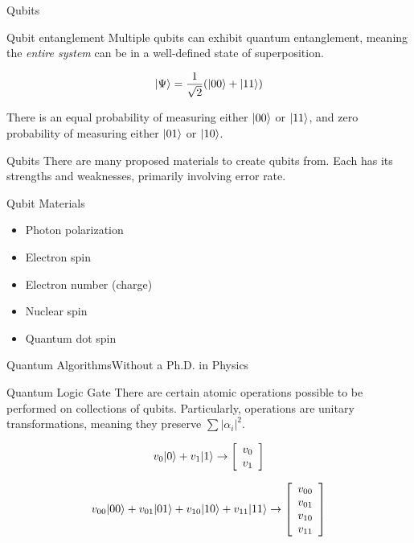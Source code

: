 \documentclass[12pt]{beamer}
\begin{document}
\begin{frame}{Qubits}
	\begin{block}{Qubit entanglement}
		Multiple qubits can exhibit quantum entanglement, meaning the
		\textit{entire system} can be in a well-defined state of superposition.

		\[ |\Psi\rangle = \frac{1}{\sqrt2}(|00\rangle + |11\rangle) \]

		There is an equal probability of measuring either $|00\rangle$ or
		$|11\rangle$, and zero probability of measuring either $|01\rangle$ or
		$|10\rangle$.
	\end{block}
\end{frame}

\begin{frame}{Qubits}
	There are many proposed materials to create qubits from. Each has its
	strengths and weaknesses, primarily involving error rate.
	\begin{block}{Qubit Materials}
		\begin{itemize}
		\item Photon polarization
		\item Electron spin
		\item Electron number (charge)
		\item Nuclear spin
		\item Quantum dot spin
		\end{itemize}
	\end{block}
\end{frame}

\begin{frame}{Quantum Algorithms}{Without a Ph.D. in Physics}
	\begin{block}{Quantum Logic Gate}
		There are certain atomic operations possible to be performed on
		collections of qubits. Particularly, operations are unitary
		transformations, meaning they preserve $\sum |\alpha_i|^2$.
	\end{block}

	\[ v_0|0\rangle + v_1|1\rangle \rightarrow \left[ \begin{array}{c} v_0 \\ v_1
	\end{array} \right] \]

	\[ v_{00}|00\rangle + v_{01}|01\rangle + v_{10}|10\rangle + v_{11}|11\rangle
	\rightarrow
	\left[ \begin{array}{c} v_{00} \\ v_{01} \\ v_{10} \\ v_{11} \end{array} \right] \]
\end{frame}
\end{document}
